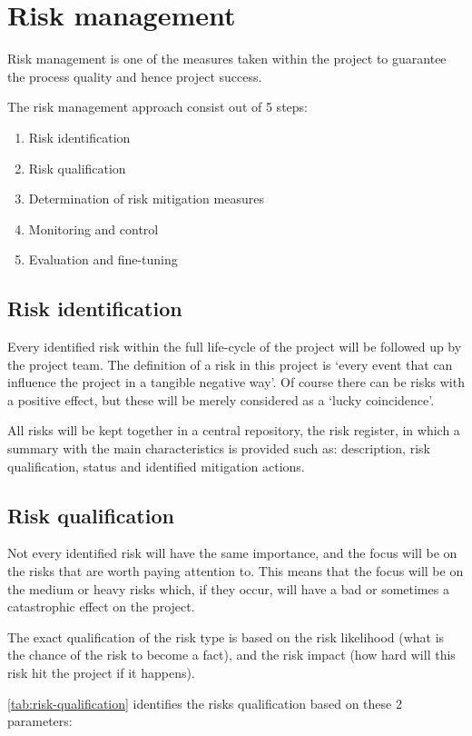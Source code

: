 \section{Risk management}
\label{sec:risk-management}
Risk management is one of the measures taken within the project to guarantee the process quality and hence project success.

The risk management approach consist out of 5 steps:

\begin{enumerate}
	\item Risk identification 
	\item Risk qualification
	\item Determination of risk mitigation measures
	\item Monitoring and control
	\item Evaluation and fine-tuning
\end {enumerate}
\subsection{Risk identification}
Every identified risk within the full life-cycle of the project will be followed up by the project team.
The definition of a risk in this project is  `every event that can influence the project in a tangible negative way'.
Of course there can be risks with a positive effect, but these will be merely considered as a `lucky coincidence'.

All risks will be kept together in a central repository, the risk register, in which a summary with the main characteristics is provided such as: description, risk qualification, status and identified mitigation actions.

\subsection{Risk qualification}
Not every identified risk will have the same importance, and the focus will be on the risks that are worth paying attention to.
This means that the focus will be on the medium or heavy risks which, if they occur, will have a bad or sometimes a catastrophic effect on the project.

The exact qualification of the risk type is based on the risk likelihood (what is the chance of the risk to become a fact), and the risk impact (how hard will this risk hit the project if it happens).

\autoref{tab:risk-qualification} identifies the risks qualification based on these 2 parameters:

